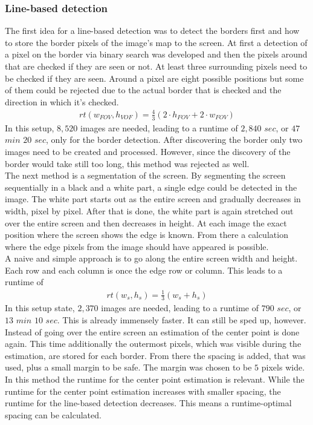 \documentclass[journal,final,a4paper,twoside]{PS}
\begin{document}
\subsubsection{Line-based detection} 
\label{sec:linebased}
The first idea for a line-based detection was to detect the borders first and how to store the border pixels of the image's map to the screen. At first a detection of a pixel on the border via binary search was developed and then the pixels around that are checked if they are seen or not. At least three surrounding pixels need to be checked if they are seen. Around a pixel are eight possible positions but some of them could be rejected due to the actual border that is checked and the direction in which it's checked. 
\begin{align}
rt(w_{FOV}, h_{VOF}) = \frac{4}{3} (2 \cdot h_{FOV} + 2 \cdot w_{FOV})
\end{align}
In this setup, $8,520$ images are needed, leading to a runtime of $2,840$ $sec$, or $47$ $min$ $20$ $sec$, only for the border detection. After discovering the border only two images need to be created and processed. However, since the discovery of the border would take still too long, this method was rejected as well.\\
The next method is a segmentation of the screen. By segmenting the screen sequentially in a black and a white part, a single edge could be detected in the image. The white part starts out as the entire screen and gradually decreases in width, pixel by pixel. After that is done, the white part is again stretched out over the entire screen and then decreases in height. At each image the exact position where the screen shows the edge is known. From there a calculation where the edge pixels from the image should have appeared is possible.\\
A naive and simple approach is to go along the entire screen width and height. Each row and each column is once the edge row or column. This leads to a runtime of
\begin{align}
rt(w_s, h_s) = \frac{1}{3} (w_s + h_s)
\end{align}
In this setup state,  $2,370$ images are needed, leading to a runtime of $790$ $sec$, or $13$ $min$ $10$ $sec$.  This is already immensely faster. It can still be sped up, however.\\
Instead of going over the entire screen an estimation of the center point is done again. This time additionally the outermost pixels, which was visible during the estimation, are stored for each border. From there the spacing is added, that was used, plus a small margin to be safe. The margin was chosen to be $5$ pixels wide. In this method the runtime for the center point estimation is relevant. While the runtime for the center point estimation increases with smaller spacing, the runtime for the line-based detection decreases. This means a runtime-optimal spacing can be calculated.\\
\end{document}
